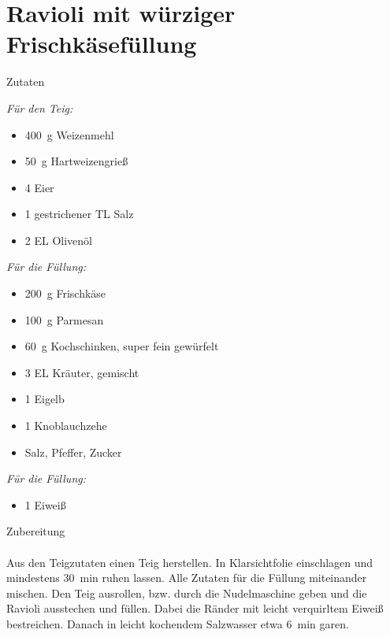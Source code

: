 \section*{Ravioli mit würziger Frischkäsefüllung}
\ihead{}\ohead{}
\cfoot{}
{\Large Zutaten}
\begin{multicols}{2}
\textit{Für den Teig:}
\begin{itemize}
    \item \SI{400}{g} Weizenmehl
    \item \SI{50}{g} Hartweizengrieß
    \item \num{4} Eier
    \item \num{1} gestrichener TL Salz
    \item \num{2} EL Olivenöl
\end{itemize}
\textit{Für die Füllung:}
\begin{itemize}
    \item \SI{200}{g} Frischkäse
    \item \SI{100}{g} Parmesan
    \item \SI{60}{g} Kochschinken, super fein gewürfelt
    \item \num{3} EL Kräuter, gemischt
    \item \num{1} Eigelb
    \item \num{1} Knoblauchzehe
    \item Salz, Pfeffer, Zucker
\end{itemize}
\textit{Für die Füllung:}
\begin{itemize}
    \item \num{1} Eiweiß
\end{itemize}
\end{multicols}
\noindent
{\Large Zubereitung}\\
\\
Aus den Teigzutaten einen Teig herstellen.
In Klarsichtfolie einschlagen und mindestens \SI{30}{min} ruhen lassen.
Alle Zutaten für die Füllung miteinander mischen. 
Den Teig ausrollen, bzw. durch die Nudelmaschine geben und die Ravioli ausstechen und füllen.
Dabei die Ränder mit leicht verquirltem Eiweiß bestreichen. 
Danach in leicht kochendem Salzwasser etwa \SI{6}{min} garen.
